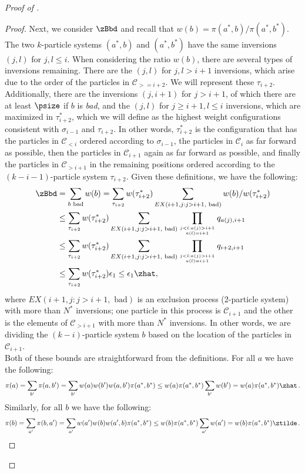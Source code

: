 \documentclass{toc}
\begin{document}
\begin{proof}[Proof of ]
\begin{proof}
Next, we consider $\zBbd$ and recall that $w(b) = 
\pi(a^*,b)/\pi(a^*,b^*).$  The two $k$-particle systems $(a^*,b)$ and 
$(a^*,b^*)$ have the same inversions $(j,l)$ for $j,l \leq i$.  When 
considering the ratio $w(b)$, there are several types of inversions 
remaining.  There are the $(j,l)$ for $j,l > i+1$ inversions, which 
arise due to the order of the particles in $\mathcal{C}_{>= i+2}$.  We 
will represent these $\tau_{i+2}$.  Additionally, there are the 
inversions $(j,i+1)$ for $j > i+1$, of which there are at least 
$\psize$ if $b$ is \emph{bad}, and the $(j,l)$ for $j \geq i+1, l \leq 
i$ inversions, which are maximized in $\tau_{i+2}^*$, which we will 
define as the highest weight configurations consistent with 
$\sigma_{i-1}$ and $\tau_{i+2}$. In other words, $\tau_{i+2}^*$ is the 
configuration that has the particles in $\mathcal{C}_{< i}$ ordered 
according to $\sigma_{i-1}$, the particles in $\mathcal{C}_{i}$ as far 
forward as possible, then the particles in $\mathcal{C}_{i+1}$ again as 
far forward as possible, and finally the particles in 
$\mathcal{C}_{>i+1}$ in the remaining positions ordered according to 
the $(k-i-1)$-particle system $\tau_{i+2}$.  Given these definitions, 
we have the following:
\begin{align*}
\zBbd &=  \sum_{b \text{ bad}} w(b)=  \sum_{\tau_{i+2}} w (\tau_{i+2}^*) \sum_{EX(i+1,j: j>i+1, \text{ bad})}w(b)/w(\tau_{i+2}^*) \\
&\leq \sum_{\tau_{i+2} }w (\tau_{i+2}^*) \sum_{EX(i+1,j: j>i+1, \text{ bad})}\prod_{j<l: a(j) > i +1\atop a(l) = i+1}q_{a(j), i+1} \\
&\leq \sum_{\tau_{i+2}} w (\tau_{i+2}^*) \sum_{EX(i+1,j: j>i+1, \text{ bad})}\prod_{j<l: a(j) > i +1\atop a(l) = i+1}q_{i+2, i+1} \\
&\leq \sum_{\tau_{i+2}} w (\tau_{i+2}^*)\epsilon_1 \leq \epsilon_1 \zhat,
\end{align*}
where $EX(i+1,j: j>i+1, \text{ bad})$ is an exclusion process 
(2-particle system) with more than $N^*$ inversions; one particle in 
this process is $\mathcal{C}_{i+1}$ and the other is the elements of 
$\mathcal{C}_{>i+1}$ with more than $N^*$ inversions.  In other words, 
we are dividing the $(k-i)$-particle system $b$ based on the location 
of the particles in $\mathcal{C}_{i+1}$.\\


Both of these bounds are straightforward from the definitions. 
For all $a$ we have the following:
 $$\pi(a) = \sum_{b'} \pi(a,b') = \sum_{b'} w(a)w(b')w(a,b')\pi(a^*,b^*) \leq w(a)\pi(a^*,b^*)\sum_{b'}w(b')= w(a)\pi(a^*,b^*)\zhat\,.$$
Similarly, for all $b$ we have the following:
 $$\pi(b) = \sum_{a'} \pi(b,a') = \sum_{a'} w(a')w(b)w(a',b)\pi(a^*,b^*) \leq w(b)\pi(a^*,b^*)\sum_{a'}w(a')= w(b)\pi(a^*,b^*)\ztilde\,.$$



\end{proof}
\end{proof}
\end{document}
